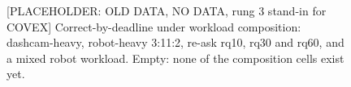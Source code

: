 \documentclass[sigconf]{acmart}
\begin{document}
{\selectfont
\begin{figure}[t]
  \centering
  
  \caption{[PLACEHOLDER: OLD DATA, NO DATA, rung 3 stand-in for COVEX] Correct-by-deadline under workload composition: dashcam-heavy, robot-heavy 3:11:2, re-ask rq10, rq30 and rq60, and a mixed robot workload. Empty: none of the composition cells exist yet.}
  \label{fig:F11_composition}
\end{figure}
}


\end{document}
